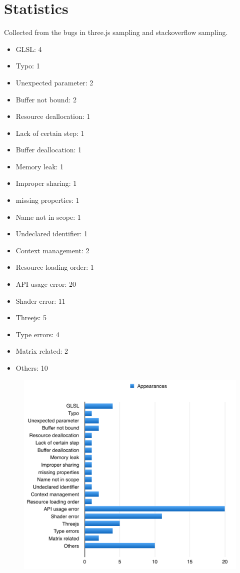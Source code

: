 \section{Statistics}\label{statistics}

Collected from the bugs in three.js sampling and stackoverflow sampling.

\begin{itemize}
\tightlist
\item
  GLSL: 4
\item
  Typo: 1
\item
  Unexpected parameter: 2
\item
  Buffer not bound: 2
\item
  Resource deallocation: 1
\item
  Lack of certain step: 1
\item
  Buffer deallocation: 1
\item
  Memory leak: 1
\item
  Improper sharing: 1
\item
  missing properties: 1
\item
  Name not in scope: 1
\item
  Undeclared identifier: 1
\item
  Context management: 2
\item
  Resource loading order: 1
\item
  API usage error: 20
\item
  Shader error: 11
\item
  Threejs: 5
\item
  Type errors: 4
\item
  Matrix related: 2
\item
  Others: 10
\end{itemize}

\begin{figure}[htbp]
\centering
\includegraphics{apperances.png}
\caption{}
\end{figure}
